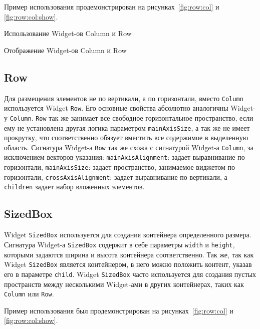 Пример использования продемонстрирован
на рисунках~\ref{fig:row:col} и \ref{fig:row:col:show}.

\begin{image}
	\caption{Использование Widget-ов Column и Row}
	\label{fig:row:col}
\end{image}

\begin{image}
	\caption{Отображение Widget-ов Column и Row}
	\label{fig:row:col:show}
\end{image}

\subsection{Row}

Для размещения элементов не по вертикали, а по горизонтали,
вместо \texttt{Column} используется Widget \texttt{Row}.
Его основные свойства абсолютно аналогичны Widget-у \texttt{Column}.
\texttt{Row} так же занимает все свободное горизонтальное пространство,
если ему не установлена другая логика параметром \texttt{mainAxisSize},
а так же не имеет прокрутку,
что соответственно обязует вместить все содержимое в выделенную область.
Сигнатура Widget-а \texttt{Row} так же схожа
с сигнатурой Widget-а \texttt{Column},
за исключением векторов указания:
\texttt{mainAxisAlignment}: задает выравнивание по горизонтали,
\texttt{mainAxisSize}: задает пространство, занимаемое виджетом по горизонтали,
\texttt{crossAxisAlignment}: задает выравнивание по вертикали,
а \texttt{children} задает набор вложенных элементов.

\subsection{SizedBox}

Widget \texttt{SizedBox} используется
для создания контейнера определенного размера.
Сигнатура Widget-а \texttt{SizedBox} содержит в себе параметры \texttt{width}
и \texttt{height}, которыми задаются ширина и высота контейнера соответственно.
Так же, так как Widget \texttt{SizedBox} является контейнером,
в него можно положить контент, указав его в параметре \texttt{child}.
Widget \texttt{SizedBox} часто используется
для создания пустых пространств между несколькими Widget-ами
в других контейнерах, таких как \texttt{Column} или \texttt{Row}.

Пример использования был продемонстрирован
на рисунках~\ref{fig:row:col} и \ref{fig:row:col:show}.

